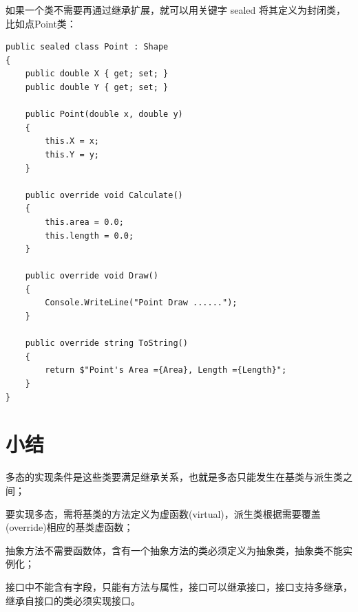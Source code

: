 如果一个类不需要再通过继承扩展，就可以用关键字 sealed 将其定义为封闭类，比如点Point类：
\begin{lstlisting}
public sealed class Point : Shape
{      
	public double X { get; set; }
	public double Y { get; set; }        
	
	public Point(double x, double y)
	{          
		this.X = x;
		this.Y = y;          
	}
	
	public override void Calculate()
	{
		this.area = 0.0;
		this.length = 0.0;
	}
	
	public override void Draw()
	{
		Console.WriteLine("Point Draw ......");
	}
	
	public override string ToString()
	{
		return $"Point's Area ={Area}, Length ={Length}";
	}
}
\end{lstlisting}





\section{小结}

多态的实现条件是这些类要满足继承关系，也就是多态只能发生在基类与派生类之间；

要实现多态，需将基类的方法定义为虚函数(virtual)，派生类根据需要覆盖(override)相应的基类虚函数；

抽象方法不需要函数体，含有一个抽象方法的类必须定义为抽象类，抽象类不能实例化；

接口中不能含有字段，只能有方法与属性，接口可以继承接口，接口支持多继承，继承自接口的类必须实现接口。
